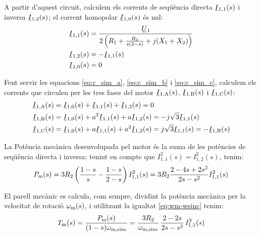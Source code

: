 \begin{center}
	
	\label{pic:mot-esq-equiv-fase-oberta}
\end{center}

A partir d'aquest circuit, calculem els corrents de seqüència directa $\cmplx{I}_{1,1}(s)$ i  inversa $\cmplx{I}_{1,2}(s)$; el corrent homopolar $\cmplx{I}_{1,0}(s)$ és nul:
\begin{subequations}
\begin{align}
	\cmplx{I}_{1,1}(s) &= \frac{\cmplx{U}_1}{2 \left( R_1 + \frac{ R_2}{s(2-s)} + j (X_1+X_2) \right)}\label{eq:I-op-1} \\
	\cmplx{I}_{1,2}(s)  &= -\cmplx{I}_{1,1}(s)\label{eq:I-op-2} \\
	\cmplx{I}_{1,0}(s)  &= 0\label{eq:I-op-0}
\end{align}
\end{subequations}
	
Fent servir les equacions	\eqref{eq:c_sim_a}, \eqref{eq:c_sim_b} i \eqref{eq:c_sim_c}, calculem els corrents que circulen per les tres fases del motor $\cmplx{I}\ped{1,A}(s)$, $\cmplx{I}\ped{1,B}(s)$ i $\cmplx{I}\ped{1,C}(s)$:
\begin{subequations}
\begin{align}
	\cmplx{I}\ped{1,A}(s) &=  \cmplx{I}_{1,0}(s) + \cmplx{I}_{1,1}(s) + \cmplx{I}_{1,2}(s) = 0\label{eq:I-op-A} \\
	\cmplx{I}\ped{1,B}(s)  &=  \cmplx{I}_{1,0}(s) + a^2 \cmplx{I}_{1,1}(s) + a \cmplx{I}_{1,2}(s) = -j \sqrt{3}  \cmplx{I}_{1,1}(s)\label{eq:I-op-B} \\
	\cmplx{I}\ped{1,C}(s)  &=  \cmplx{I}_{1,0}(s) + a \cmplx{I}_{1,1}(s) + a^2 \cmplx{I}_{1,2}(s) = j \sqrt{3}  \cmplx{I}_{1,1}(s) = -\cmplx{I}\ped{1,B}(s)\label{eq:I-op-C}
\end{align}
\end{subequations}

 
La Potència mecànica desenvolupada pel motor és la suma de les potències de seqüència directa i inversa;  tenint en compte que $I_{1,1}^2(s) = I_{1,2}^2(s)$, tenim:
\begin{equation}
	P_\mathrm{m}(s) = 3 R_2 \left(\frac{1-s}{s} - \frac{1-s}{2-s} \right) I_{1,1}^2(s)  = 3 R_2 \frac{2 - 4s + 2s^2}{2s - s^2}  I_{1,1}^2(s) \label{eq:P_m-op} 
\end{equation}

El parell mecànic es calcula, com sempre, dividint la potència mecànica per la velocitat de rotació $\omega_\mathrm{m}(s)$, i utilitzant la igualtat \eqref{eq:wm-wsinc} tenim:
\begin{equation}
	T_\mathrm{m}(s) = \frac{P_\mathrm{m}(s)}{(1-s) \omega_\mathrm{m,sinc}} = \frac{3 R_2}{\omega_\mathrm{m,sinc}} \,\frac{2-2s}{2s-s^2}  \,I_{1,1}^2(s)\label{eq:T_m-op}
\end{equation}
	    	    
